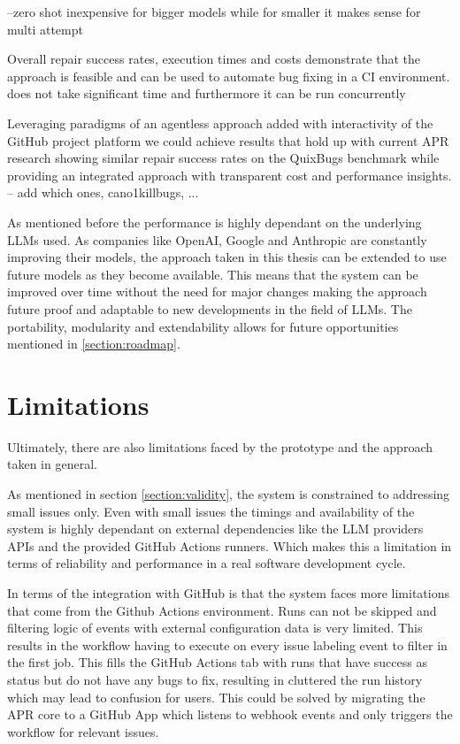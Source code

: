 --zero shot inexpensive for bigger models while for smaller it makes sense for multi attempt

Overall repair success rates, execution times and costs demonstrate that the approach is feasible and can be used to automate bug fixing in a CI environment.
does not take significant time and furthermore it can be run concurrently

Leveraging paradigms of an agentless approach added with interactivity of the GitHub project platform we could achieve results that hold up with current APR research showing similar repair success rates on the QuixBugs benchmark while providing an integrated approach with transparent cost and performance insights. -- add which ones, cano1killbugs, ...

As mentioned before the performance is highly dependant on the underlying LLMs used. As companies like OpenAI, Google and Anthropic are constantly improving their models, the approach taken in this thesis can be extended to use future models as they become available. This means that the system can be improved over time without the need for major changes making the approach future proof and adaptable to new developments in the field of LLMs. The portability, modularity and extendability allows for future opportunities mentioned in \ref{section:roadmap}.

\section{Limitations}
Ultimately, there are also limitations faced by the prototype and the approach taken in general.

As mentioned in section \ref{section:validity}, the system is constrained to addressing small issues only. Even with small issues the timings and availability of the system is highly dependant on external dependencies like the LLM providers APIs and the provided GitHub Actions runners. Which makes this a limitation in terms of reliability and performance in a real software development cycle.

In terms of the integration with GitHub is that the system faces more limitations that come from the Github Actions environment. Runs can not be skipped and filtering logic of events with external configuration data is very limited. This results in the workflow having to execute on every issue labeling event to filter in the first job. This fills the GitHub Actions tab with runs that have success as status but do not have any bugs to fix, resulting in cluttered the run history which may lead to confusion for users. This could be solved by migrating the APR core to a GitHub App which listens to webhook events and only triggers the workflow for relevant issues.

